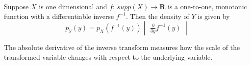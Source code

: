 Suppose $X$ is one dimensional and $f$: $supp(X) \to \mathbf{R}$ is a one-to-one, monotonic function with a differentiable inverse $f^{-1}$. Then the density of $Y$ is given by
$$ p_Y(y) = p_X(f^{-1}(y)) \begin{vmatrix} \frac{\partial}{\partial y} f^{-1}(y) \end{vmatrix}$$

The absolute derivative of the inverse transform measures how the scale of the transformed variable changes with respect to the underlying variable.







